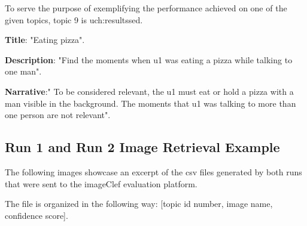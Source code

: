 To serve the purpose of exemplifying the performance achieved on one of the given topics, topic 9 is uch:resultssed.

\textbf{Title}: "Eating pizza".

\textbf{Description}: "Find the moments when u1 was eating a pizza
while talking to one man".

\textbf{Narrative}:" To be considered relevant, the u1 must eat or
hold a pizza with a man visible in the background. The moments that
u1 was talking to more than one person are not relevant".


\subsection{Run 1 and Run 2 Image Retrieval Example}

The following images showcase an excerpt of the csv files generated by both runs that were sent to the imageClef evaluation platform.

The file is organized in the following way: [topic id number, image name, confidence score].


